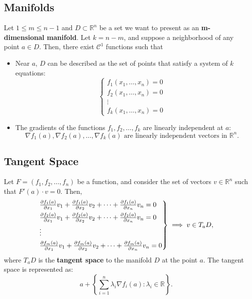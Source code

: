 \documentclass[11pt]{article}
\begin{document}
\subsection{Manifolds}
Let \(1 \leq m \leq n - 1\) and \(D \subset \mathbb{R}^n\) be a set we want to present as an \textbf{m-dimensional manifold}.
Let \(k = n - m\), and suppose a neighborhood of any point \(a \in D\). Then, there exist \(\mathcal{C}^1\) functions such that 
\begin{itemize}
    \item Near \(a\), \(D\) can be described as the set of points that satisfy a system of \(k\) equations:
    \[\begin{cases}f_1(x_1, \dots, x_n) = 0 \\
    f_2(x_1, \dots, x_n) = 0 \\
    \vdots \\
    f_k(x_1, \dots, x_n) = 0\end{cases}\]
    \item The gradients of the functions \(f_1, f_2, \dots, f_k\) are linearly independent at \(a\):
    \[\nabla f_1(a), \nabla f_2(a), \dots, \nabla f_k(a) \text{ are linearly independent vectors in } \mathbb{R}^n.\]
\end{itemize}

\subsection{Tangent Space}
Let \(F = (f_1, f_2, \dots, f_n)\) be a function, and consider the set of vectors \(v \in \mathbb{R}^n\) such that \(F'(a) \cdot v = 0\). Then, 
\[\begin{rcases}
    \frac{\partial f_1(a)}{\partial x_1} v_1 + \frac{\partial f_1(a)}{\partial x_2} v_2 + \cdots + \frac{\partial f_1(a)}{\partial x_n} v_n = 0 \\
    \frac{\partial f_2(a)}{\partial x_1} v_1 + \frac{\partial f_2(a)}{\partial x_2} v_2 + \cdots + \frac{\partial f_2(a)}{\partial x_n} v_n = 0 \\
    \vdots \\
    \frac{\partial f_m(a)}{\partial x_1} v_1 + \frac{\partial f_m(a)}{\partial x_2} v_2 + \cdots + \frac{\partial f_m(a)}{\partial x_n} v_n = 0
\end{rcases} \implies v \in T_a D,\]
where \(T_a D\) is the \textbf{tangent space} to the manifold \(D\) at the point \(a\). The tangent space is represented as:
\[a + \left\{\sum_{i=1}^n \lambda_i \nabla f_i(a) : \lambda_i \in \mathbb{R}\right\}.\]
\end{document}
